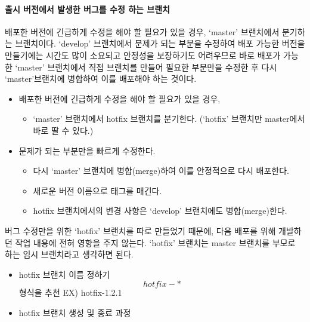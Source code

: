 \documentclass[12pt, a4paper, oneside]{book}
\begin{document}
			\paragraph{출시 버전에서 발생한 버그를 수정 하는 브랜치} 
			배포한 버전에 긴급하게 수정을 해야 할 필요가 있을 경우, ‘master’ 브랜치에서 분기하는 브랜치이다. 
			‘develop’ 브랜치에서 문제가 되는 부분을 수정하여 배포 가능한 버전을 만들기에는 시간도 많이 소요되고 안정성을 보장하기도 어려우므로 
			바로 배포가 가능한 ‘master’ 브랜치에서 직접 브랜치를 만들어 필요한 부분만을 수정한 후 다시 ‘master’브랜치에 병합하여 이를 배포해야 하는 것이다.
			
			\begin{itemize}
			\item 배포한 버전에 긴급하게 수정을 해야 할 필요가 있을 경우,
				\begin{itemize}
					\item ‘master’ 브랜치에서 hotfix 브랜치를 분기한다. (‘hotfix’ 브랜치만 master에서 바로 딸 수 있다.)
				\end{itemize}
			\item 문제가 되는 부분만을 빠르게 수정한다.
				\begin{itemize}
					\item 다시 ‘master’ 브랜치에 병합(merge)하여 이를 안정적으로 다시 배포한다.
					\item 새로운 버전 이름으로 태그를 매긴다.
					\item hotfix 브랜치에서의 변경 사항은 ‘develop’ 브랜치에도 병합(merge)한다.
				\end{itemize}
			\end{itemize}
			
			
			버그 수정만을 위한 ‘hotfix’ 브랜치를 따로 만들었기 때문에, 다음 배포를 위해 개발하던 작업 내용에 전혀 영향을 주지 않는다. ‘hotfix’ 브랜치는 master 브랜치를 부모로 하는 임시 브랜치라고 생각하면 된다.
			
				\begin{itemize}
					\item hotfix 브랜치 이름 정하기 \\
							\[hotfix-* \] 형식을 추천 EX) hotfix-1.2.1
					\item hotfix 브랜치 생성 및 종료 과정
				\end{itemize}
\end{document}
